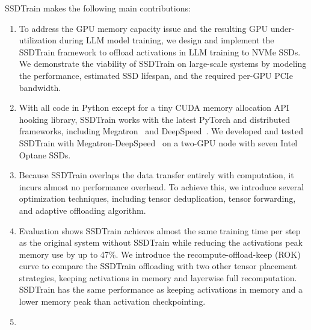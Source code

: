 SSDTrain makes the following main contributions:
\begin{enumerate}[1.]
\item To address the GPU memory capacity issue and the resulting GPU under-utilization during LLM model training, we design and implement the SSDTrain framework to offload activations in LLM training to NVMe SSDs. We demonstrate the viability of SSDTrain on large-scale systems by modeling the performance, estimated SSD lifespan, and the required per-GPU PCIe bandwidth. 
\item With all code in Python except for a tiny CUDA memory allocation API hooking library, SSDTrain works with the latest PyTorch and distributed frameworks, including Megatron~\cite{shoeybiMegatronLMTrainingMultiBillion2020a} and DeepSpeed~\cite{rasleyDeepSpeedSystemOptimizations2020}. We developed and tested SSDTrain with Megatron-DeepSpeed~\cite{microsoftMicrosoftMegatronDeepSpeedOngoing2019} on a two-GPU node with seven Intel Optane SSDs. 
\item Because SSDTrain overlaps the data transfer entirely with computation, it incurs almost no performance overhead. To achieve this, we introduce several optimization techniques, including tensor deduplication, tensor forwarding, and adaptive offloading algorithm. 
\item Evaluation shows SSDTrain achieves almost the same training time per step as the original system without SSDTrain while reducing the activations peak memory use by up to 47\%. We introduce the recompute-offload-keep (ROK) curve to compare the SSDTrain offloading with two other tensor placement strategies, keeping activations in memory and layerwise full recomputation. SSDTrain has the same performance as keeping activations in memory and a lower memory peak than activation checkpointing. 
\item {}
\end{enumerate}
